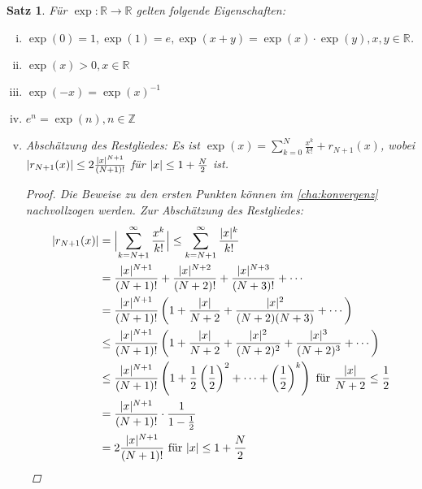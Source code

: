 \documentclass[ngerman,titlepage,twoside, parskip=half*]{scrreprt}
\newcommand*{\Z}{\mathbb{Z}}
\newcommand*{\R}{\mathbb{R}}
\theoremstyle{break}
\newtheorem{theorem}{Satz}[section]
\theoremstyle{nonumberbreak}
\newtheorem{proof}{Beweis:}
\DeclarePairedDelimiter{\abs}{\lvert}{\rvert}
\begin{document}
\begin{theorem}\label{satz:expEigenschaft}
  Für $\exp\colon\R\rightarrow\R$ gelten folgende Eigenschaften:
  \begin{enumerate}[(i)]
  \item $\exp(0)=1, \exp(1)=e, \exp(x+y)=\exp(x)\cdot \exp(y), x,y \in
    \R$.
  \item $\exp(x)>0, x\in \R$
  \item $\exp(-x)=\exp(x)^{-1}$
  \item $e^n=\exp(n), n\in \Z$
  \item Abschätzung des Restgliedes:
    Es ist $\exp(x)=\sum_{k=0}^N \frac{x^k}{k!} + r_{N+1}(x)$, wobei
    $\abs{r_{N+1}(x)} \leq 2\frac{\abs{x}^{N+1}}{(N+1)!}$ für
    $\abs{x}\leq 1+\frac{N}{2}$ ist.
    \begin{proof}
      Die Beweise zu den ersten Punkten können im \autoref{cha:konvergenz}
      nachvollzogen werden. Zur Abschätzung des Restgliedes:
      \begin{align*}
        \abs{r_{N+1}(x)} &= \abs[\Big]{\sum_{k=N+1}^\infty
          \frac{x^k}{k!}} \leq \sum_{k=N+1}^\infty\frac{\abs{x}^k}{k!}\\
        &= \frac{\abs{x}^{N+1}}{(N+1)!} +\frac{\abs{x}^{N+2}}{(N+2)!}
        +\frac{\abs{x}^{N+3}}{(N+3)!} +\cdots\\
        &= \frac{\abs{x}^{N+1}}{(N+1)!} \left(1+\frac{\abs{x}}{N+2}
          +\frac{\abs{x}^2}{(N+2)(N+3)}+\dotsb\right)\\
        &\leq \frac{\abs{x}^{N+1}}{(N+1)!} \left(
          1+\frac{\abs{x}}{N+2}+ \frac{\abs{x}^2}{(N+2)^2}+
          \frac{\abs{x}^3}{(N+2)^3}+ \dotsb \right)\\
        &\leq \frac{\abs{x}^{N+1}}{(N+1)!} \left( 1+
          \frac{1}{2}\left(\frac{1}{2}\right)^2 +\dotsb +
          \left(\frac{1}{2}\right)^k\right) \text{ für }
        \frac{\abs{x}}{N+2}\leq \frac{1}{2}\\
        &= \frac{\abs{x}^{N+1}}{(N+1)!}\cdot \frac{1}{1-\frac{1}{2}}\\
        &= 2\frac{\abs{x}^{N+1}}{(N+1)!} \text{ für } \abs{x}\leq
        1+\frac{N}{2}
      \end{align*}      
    \end{proof}
  \end{enumerate}
\end{theorem}
\end{document}
